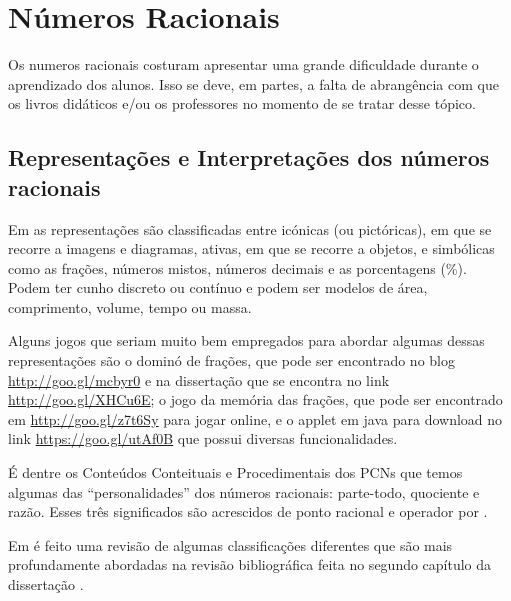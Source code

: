 \chapter{Números Racionais}


Os numeros racionais costuram apresentar uma grande dificuldade durante o aprendizado dos alunos. Isso se deve, em partes, a falta de abrangência com que os livros didáticos e/ou os professores no momento de se tratar desse tópico.

\section{Representações e Interpretações dos números racionais}

Em \cite{palhares2011complementos} as representações são classificadas entre icónicas \linebreak (ou pictóricas), em que se recorre a imagens e diagramas, ativas, em que se recorre a objetos, e simbólicas como as frações, números mistos, números decimais e as porcentagens (\%). Podem ter cunho discreto ou contínuo e podem ser modelos de área, comprimento, volume, tempo ou massa.

Alguns jogos que seriam muito bem empregados para abordar algumas dessas representações são o dominó de frações, que pode ser encontrado no blog \url{http://goo.gl/mcbyr0} e na dissertação que se encontra no link \url{http://goo.gl/XHCu6E}; o jogo da memória das frações, que pode ser encontrado em \url{http://goo.gl/z7t6Sy} para jogar online, e o applet em java para download no link \url{https://goo.gl/utAf0B} que possui diversas funcionalidades.

É dentre os Conteúdos Conteituais e Procedimentais dos PCNs que temos algumas das ``personalidades'' dos números racionais: parte-todo, quociente e razão. Esses três significados são acrescidos de ponto racional e operador por  \cite{onuchic2008diferentes}. 

Em \cite{palhares2011complementos} é feito uma revisão de algumas classificações diferentes que são mais profundamente abordadas na revisão bibliográfica feita no segundo capítulo da dissertação \linebreak \cite{rodriguesnumeros}.

